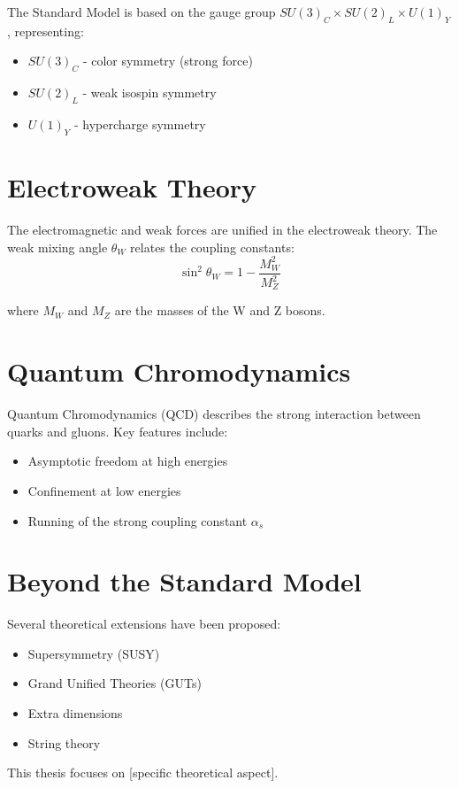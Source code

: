 The Standard Model is based on the gauge group $SU(3)_C \times SU(2)_L \times U(1)_Y$, representing:
\begin{itemize}
  \item $SU(3)_C$ - color symmetry (strong force)
  \item $SU(2)_L$ - weak isospin symmetry
  \item $U(1)_Y$ - hypercharge symmetry
\end{itemize}

\section{Electroweak Theory}

The electromagnetic and weak forces are unified in the electroweak theory. The weak mixing angle $\theta_W$ relates the coupling constants:
\begin{equation}
  \sin^2\theta_W = 1 - \frac{M_W^2}{M_Z^2}
  \label{eq:weinberg-angle}
\end{equation}

where $M_W$ and $M_Z$ are the masses of the W and Z bosons.

\section{Quantum Chromodynamics}

Quantum Chromodynamics (QCD) describes the strong interaction between quarks and gluons. Key features include:
\begin{itemize}
  \item Asymptotic freedom at high energies
  \item Confinement at low energies
  \item Running of the strong coupling constant $\alpha_s$
\end{itemize}

\section{Beyond the Standard Model}

Several theoretical extensions have been proposed:
\begin{itemize}
  \item Supersymmetry (SUSY)
  \item Grand Unified Theories (GUTs)
  \item Extra dimensions
  \item String theory
\end{itemize}

This thesis focuses on [specific theoretical aspect].
